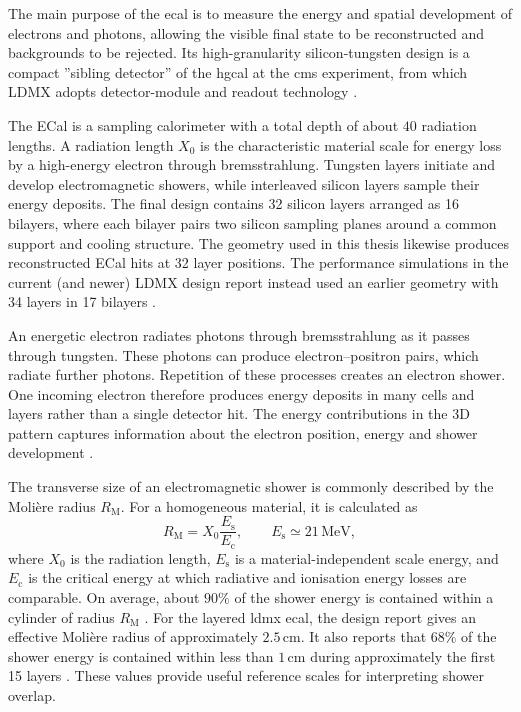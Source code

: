 The main purpose of the \gls{ecal} is to measure the energy and spatial
development of electrons and photons, allowing the visible final state to be
reconstructed and backgrounds to be rejected. Its high-granularity 
silicon-tungsten design is a compact ''sibling detector'' of the \gls{hgcal} at the \gls{cms} experiment, from which LDMX adopts detector-module and readout technology
\cite{ldmx2025-overview}.


The ECal is a sampling calorimeter with a total depth of about \(40\)
radiation lengths. A radiation length \(X_0\) is the characteristic material
scale for energy loss by a high-energy electron through bremsstrahlung.
Tungsten layers initiate and develop electromagnetic showers, while
interleaved silicon layers sample their energy deposits. The final design
contains 32 silicon layers arranged as 16 bilayers, where each bilayer pairs
two silicon sampling planes around a common support and cooling structure.
The  geometry used in this thesis likewise produces
reconstructed ECal hits at 32 layer positions. The performance simulations in
the current (and newer) LDMX design report instead used an earlier geometry with 34
layers in 17 bilayers \cite{ldmx2025-overview}.

An energetic electron radiates photons through \gls{bremsstrahlung} as it
passes through tungsten. These photons can produce electron--positron pairs,
which radiate further photons. Repetition of these processes creates an
\gls{electron shower}. One incoming electron therefore produces energy
deposits in many cells and layers rather than a single detector hit. The energy contributions in the 3D pattern captures information about the electron position,
energy and shower development \cite{groom2024-passage-particles}.

The transverse size of an electromagnetic shower is commonly described by
the Molière radius \(R_{\mathrm{M}}\). For a homogeneous material, it is
calculated as
\begin{equation}
    R_{\mathrm{M}} = X_0\frac{E_{\mathrm{s}}}{E_{\mathrm{c}}},
    \qquad E_{\mathrm{s}} \simeq 21\,\mathrm{MeV},
    \label{eq:moliere_radius}
\end{equation}
where \(X_0\) is the radiation length, \(E_{\mathrm{s}}\) is a
material-independent scale energy, and \(E_{\mathrm{c}}\) is the critical
energy at which radiative and ionisation energy losses are comparable. On
average, about \(90\%\) of the shower energy is contained within a cylinder
of radius \(R_{\mathrm{M}}\) \cite{groom2024-passage-particles}. For the
layered \gls{ldmx} \gls{ecal}, the design report gives an effective Molière radius of
approximately \(2.5\,\mathrm{cm}\). It also reports that \(68\%\) of the
shower energy is contained within less than \(1\,\mathrm{cm}\) during
approximately the first 15 layers \cite{ldmx2025-overview}. These values
provide useful reference scales for interpreting shower overlap.


